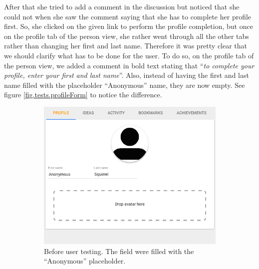 \documentclass[a4paper,12pt, oneside]{article}
\begin{document}
After that she tried to add a comment in the discussion but noticed that she could not when she saw the comment saying that she has to complete her profile first.
So, she clicked on the given link to perform the profile completion, but once on the profile tab of the person view, she rather went through all the other tabs rather than changing her first and last name.
Therefore it was pretty clear that we should clarify what has to be done for the user.
To do so, on the profile tab of the person view, we added a comment in bold text stating that “\emph{to complete your profile, enter your first and last name}”.
Also, instead of having the first and last name filled with the placeholder “Anonymous” name, they are now empty.
See figure \ref{fig.tests.profileForm} to notice the difference.

\begin{figure}[!htb]
    \begin{subfigure}[t]{.495\textwidth}
        \includegraphics[width=\textwidth]{images/user_tests/profileForm_before.png}
        \caption{Before user testing. The field were filled with the “Anonymous” placeholder.}
        \label{fig.tests.profileForm.before}
    \end{subfigure}
    \hfill
    \begin{subfigure}[t]{.495\textwidth}

\end{subfigure}
\end{figure}
\end{document}
